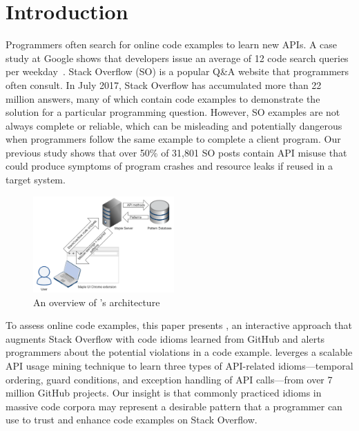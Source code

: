 \section{Introduction}
\label{sec:intro}
Programmers often search for online code examples to learn new APIs. A case study at Google shows that developers issue an average of 12 code search queries per weekday~\cite{sadowski2015developers}. Stack Overflow (SO) is a popular Q\&A website that programmers often consult. In July 2017, Stack Overflow has accumulated more than 22 million answers, many of which contain code examples to demonstrate the solution for a particular programming question. However, SO examples are not always complete or reliable, which can be misleading and potentially dangerous when programmers follow the same example to complete a client program. Our previous study shows that over 50\% of 31,801 SO posts contain API misuse that could produce symptoms of program crashes and resource leaks if reused in a target system. %

\begin{figure}
\includegraphics[width=0.48\textwidth]{mapleUIsystemflow.PNG}
\vspace{.1in}
\caption{An overview of {\soa}'s architecture}
\label{fig:arch}
\end{figure}

To assess online code examples, this paper presents {\soa}, an interactive approach that augments Stack Overflow with code idioms learned from GitHub and alerts programmers about the potential violations in a code example. {\soa} leverges a scalable API usage mining technique to learn three types of API-related idioms---temporal ordering, guard conditions, and exception handling of API calls---from over 7 million GitHub projects. Our insight is that commonly practiced idioms in massive code corpora may represent a desirable pattern that a programmer can use to trust and enhance code examples on Stack Overflow. 

